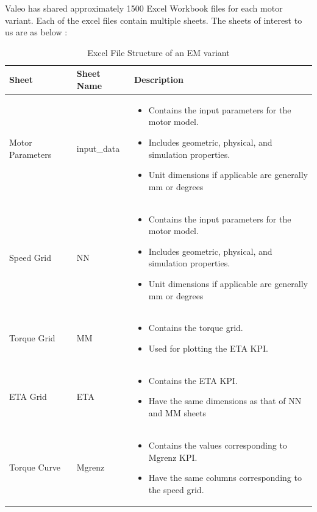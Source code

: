 \documentclass{report} %
\begin{document}
Valeo has shared approximately 1500 Excel Workbook files for each motor variant. Each of the excel files contain multiple sheets.
The sheets of interest to us are as below :
\begin{table}[H]
    \centering
    \begin{tabular}{|p{2cm}|p{2cm}|p{11cm}|}
    \hline {\bf Sheet} & {\bf Sheet Name} & {\bf Description}\\
    \hline Motor Parameters & input\_data & 
    \begin{itemize}
        \item Contains the input parameters for the motor model.
        \item Includes geometric, physical, and simulation properties.
        \item Unit dimensions if applicable are generally mm or degrees 
    \end{itemize}\\
    Speed Grid & NN & 
    \begin{itemize}
        \item Contains the input parameters for the motor model.
        \item Includes geometric, physical, and simulation properties.
        \item Unit dimensions if applicable are generally mm or degrees 
    \end{itemize}\\
    Torque Grid & MM & 
    \begin{itemize}
        \item Contains the torque grid.
        \item Used for plotting the ETA \ac{KPI}.
    \end{itemize}\\
    ETA Grid & ETA & 
    \begin{itemize}
        \item Contains the ETA \ac{KPI}.
        \item Have the same dimensions as that of NN and MM sheets
    \end{itemize}\\
    Torque Curve & Mgrenz & 
    \begin{itemize}
        \item Contains the values corresponding to Mgrenz \ac{KPI}.
        \item Have the same columns corresponding to the speed grid.
    \end{itemize}\\
    \hline
    \end{tabular}
    \caption{Excel File Structure of an \ac{EM} variant}
    \label{tab:Excel File Structure}
\end{table}
\end{document}
